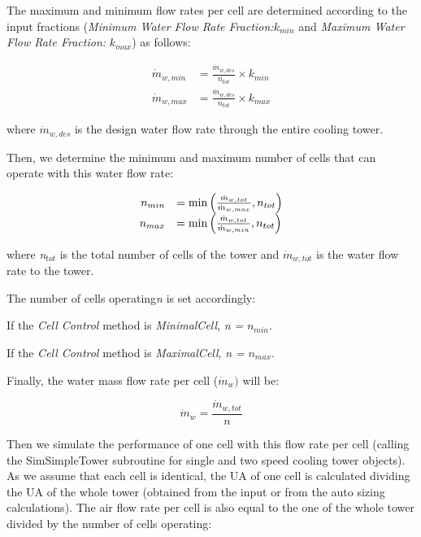 The maximum and minimum flow rates per cell are determined according to the input fractions (\emph{Minimum Water Flow Rate Fraction:}\({k_{min}}\) and \emph{Maximum Water Flow Rate Fraction:} \({k_{max}}\)) as follows:

\begin{equation}
    \begin{array}{rl}
      \dot{m}_{w,min} &= \frac{\dot{m}_{w,des}}{n_{tot}} \times k_{min} \\
      \dot{m}_{w,max} &= \frac{\dot{m}_{w,des}}{n_{tot}} \times k_{max}
    \end{array}
\end{equation}

where \({{{\dot m}_{w,des}}}\) is the design water flow rate through the entire cooling tower.

Then, we determine the minimum and maximum number of cells that can operate with this water flow rate:

\begin{equation}
    \begin{array}{rl}
      n_{min} & = \min\left(\frac{\dot{m}_{w,tot}}{\dot{m}_{w,max}},n_{tot}\right) \\
      n_{max} & = \min\left(\frac{\dot{m}_{w,tot}}{\dot{m}_{w,min}},n_{tot}\right)
    \end{array}
\end{equation}

where \emph{n\(_{tot}\)} is the total number of cells of the tower and \({{{\dot m}_{w,tot}}}\) is the water flow rate to the tower.

The number of cells operating\emph{n} is set accordingly:

If the \emph{Cell Control} method is \emph{MinimalCell}, \emph{n =} \({{n_{min}}}\).

If the \emph{Cell Control} method is \emph{MaximalCell}, \emph{n =} \({{n_{max}}}\).

Finally, the water mass flow rate per cell (\({{\dot m}_w})\) will be:

\begin{equation}
{{\dot m}_w} = \frac{{{{\dot m}_{w,tot}}}}{n}
\end{equation}

Then we simulate the performance of one cell with this flow rate per cell (calling the SimSimpleTower subroutine for single and two speed cooling tower objects). As we assume that each cell is identical, the UA of one cell is calculated dividing the UA of the whole tower (obtained from the input or from the auto sizing calculations). The air flow rate per cell is also equal to the one of the whole tower divided by the number of cells operating:

